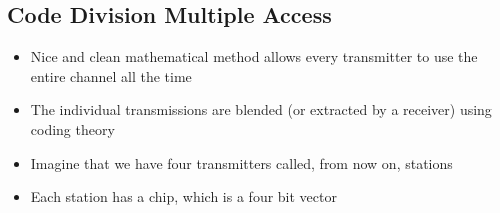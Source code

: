 \documentclass{article}[18pt]
\begin{document}
\subsection{Code Division Multiple Access}
\begin{itemize}
	\item Nice and clean mathematical method allows every transmitter to use the entire channel all the time
	\item The individual transmissions are blended (or extracted by a receiver) using coding theory
	\item Imagine that we have four transmitters called, from now on, stations
	\item Each station has a chip, which is a four bit vector
\end{itemize}
\end{document}
